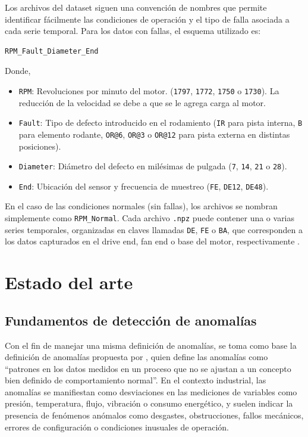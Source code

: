\documentclass[11pt,a4paper,spanish]{book}
\numberwithin{equation}{chapter}
\numberwithin{figure}{chapter}
\begin{document}
Los archivos del dataset siguen una convención de nombres que permite identificar 
fácilmente las condiciones de operación y el tipo de falla asociada a cada serie temporal.
Para los datos con fallas, el esquema utilizado es:


\begin{verbatim}
RPM_Fault_Diameter_End
\end{verbatim}


Donde, 

\begin{itemize}

	\item \texttt{RPM}: Revoluciones por minuto del motor. 
	(\texttt{1797}, \texttt{1772}, \texttt{1750} o \texttt{1730}).
	La reducción de la velocidad se debe a que se le agrega carga al motor.

	\item \texttt{Fault}: Tipo de defecto introducido en el rodamiento 
	(\texttt{IR} para pista interna, \texttt{B} para elemento rodante, \texttt{OR@6}, 
	\texttt{OR@3} o \texttt{OR@12} para pista externa en distintas posiciones).

	\item \texttt{Diameter}: Diámetro del defecto en milésimas de pulgada 
	(\texttt{7}, \texttt{14}, \texttt{21} o \texttt{28}).

	\item \texttt{End}: Ubicación del sensor y frecuencia de muestreo (\texttt{FE}, 
	\texttt{DE12}, \texttt{DE48}).
\end{itemize}


En el caso de las condiciones normales (sin fallas), los archivos se nombran simplemente 
como \texttt{RPM\_Normal}. 
Cada archivo \texttt{.npz} puede contener una o varias series temporales, 
organizadas en claves llamadas \texttt{DE}, \texttt{FE} o \texttt{BA}, que corresponden 
a los datos capturados en el drive end, fan end o base del motor, respectivamente 
\cite{rigas2024marine}.


\section{Estado del arte}

\subsection{Fundamentos de detección de anomalías}

Con el fin de manejar una misma definición de anomalías, se toma como base la 
definición de anomalías propuesta por \cite{leon2012anomalias}, quien define las 
anomalías como “patrones en los datos medidos en un proceso que no se ajustan a un 
concepto bien definido de comportamiento normal”. 
En el contexto industrial, las anomalías se manifiestan como desviaciones en las 
mediciones de variables como presión, temperatura, flujo, vibración o consumo 
energético, y suelen indicar la presencia de fenómenos anómalos como desgastes, 
obstrucciones, fallos mecánicos, errores de configuración o condiciones inusuales 
de operación.
\end{document}
